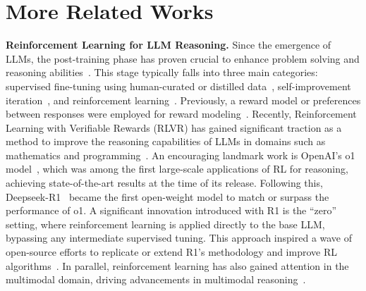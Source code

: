 




\section{More Related Works}
\label{appendix:more-related}

\noindent\textbf{Reinforcement Learning for LLM Reasoning.}
Since the emergence of LLMs, the post-training phase has proven crucial to enhance problem solving and reasoning abilities~\cite{ouyang2022training}. This stage typically falls into three main categories: supervised fine-tuning using human-curated or distilled data~\cite{wang2023far}, self-improvement iteration~\cite{zelikman2022star, gulcehre2023reinforced}, and reinforcement learning~\cite{ouyang2022training}.
Previously, a reward model or preferences between responses were employed for reward modeling~\cite{ouyang2022training, rafailov2023dpo}.
Recently, Reinforcement Learning with Verifiable Rewards (RLVR) has gained significant traction as a method to improve the reasoning capabilities of LLMs in domains such as mathematics and programming~\cite{lambert2024tulu3,shao2024deepseekmath}. 
An encouraging landmark work is OpenAI's o1 model~\cite{jaech2024openaio1}, which was among the first large-scale applications of RL for reasoning, achieving state-of-the-art results at the time of its release.
Following this, Deepseek-R1~\cite{guo2025deepseek-r1} became the first open-weight model to match or surpass the performance of o1. 
A significant innovation introduced with R1 is the ``zero'' setting, where reinforcement learning is applied directly to the base LLM, bypassing any intermediate supervised tuning.
This approach inspired a wave of open-source efforts to replicate or extend R1's methodology and improve RL algorithms~\cite{zeng2025simplerl, liu2025oat, yu2025dapo, code-r1, zhao2025absolute, wang2025beyond}.
In parallel, reinforcement learning has also gained attention in the multimodal domain, driving advancements in multimodal reasoning~\cite{chen2025r1v, shen2025vlmr1, zheng2025easyr1}.

